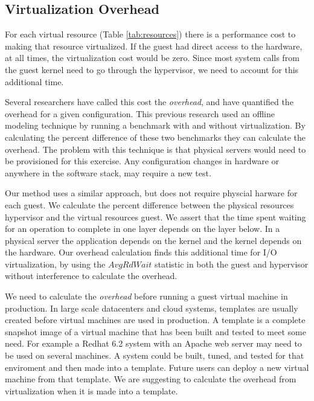 \subsection{Virtualization Overhead}
For each virtual resource (Table \ref{tab:resources}) there is a performance cost to making that resource virtualized.  If the guest had direct access to the hardware, at all times, the virtualization cost would be zero.  Since most system calls from the guest kernel need to go through the hypervisor, we need to account for this additional time.

Several researchers \cite{cherkasova, huber1} have called this cost the \emph{overhead}, and have quantified the overhead for a given configuration.  This previous research used an offline modeling technique by running a benchmark with and without virtualization.  By calculating the percent difference of these two benchmarks they can calculate the overhead.
The problem with this technique is that physical servers would need to be provisioned for this exercise.  Any configuration changes in hardware or anywhere in the software stack, may require a new test.  

Our method uses a similar approach, but does not require physcial harware for each guest.  We calculate the percent difference between the physical resources hypervisor and the virtual resources guest. 
We assert that the time spent waiting for an operation to complete in one layer depends on the layer below.  
In a physical server the application depends on the kernel and the kernel depends on the hardware.  
Our overhead calculation finds this additional time for I/O virtualization, by using the $AvgRdWait$ statistic in both the guest and hypervisor without interference to calculate the overhead.

We need to calculate the \emph{overhead} before running a guest virtual machine in production. 
In large scale datacenters and cloud systems, templates are usually created before virtual machines are used in production.  A template is a complete snapshot image of a virtual machine that has been built and tested to meet some need.  For example a Redhat 6.2 system with an Apache web server may need to be used on several machines.  A system could be built, tuned, and tested for that enviroment and then made into a template.  Future users can deploy a new virtual machine from that template.  We are suggesting to calculate the overhead from virtualization when it is made into a template.  

